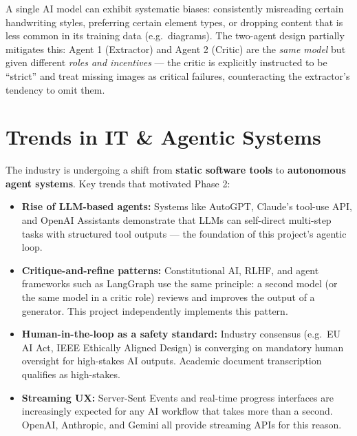 \documentclass[12pt,a4paper]{article}
\begin{document}
A single AI model can exhibit systematic biases: consistently misreading certain handwriting
styles, preferring certain element types, or dropping content that is less common in its
training data (e.g.\ diagrams). The two-agent design partially mitigates this:
Agent 1 (Extractor) and Agent 2 (Critic) are the \emph{same model} but given different
\emph{roles and incentives} — the critic is explicitly instructed to be ``strict'' and treat
missing images as critical failures, counteracting the extractor's tendency to omit them.


\section{Trends in IT \& Agentic Systems}

The industry is undergoing a shift from \textbf{static software tools} to
\textbf{autonomous agent systems}. Key trends that motivated Phase 2:

\begin{itemize}[noitemsep]
  \item \textbf{Rise of LLM-based agents:} Systems like AutoGPT, Claude's tool-use API, and
    OpenAI Assistants demonstrate that LLMs can self-direct multi-step tasks with structured
    tool outputs — the foundation of this project's agentic loop.

  \item \textbf{Critique-and-refine patterns:} Constitutional AI, RLHF, and agent frameworks
    such as LangGraph use the same principle: a second model (or the same model in a critic role)
    reviews and improves the output of a generator. This project independently implements this
    pattern.

  \item \textbf{Human-in-the-loop as a safety standard:} Industry consensus (e.g.\ EU AI Act,
    IEEE Ethically Aligned Design) is converging on mandatory human oversight for high-stakes
    AI outputs. Academic document transcription qualifies as high-stakes.

  \item \textbf{Streaming UX:} Server-Sent Events and real-time progress interfaces are
    increasingly expected for any AI workflow that takes more than a second. OpenAI, Anthropic,
    and Gemini all provide streaming APIs for this reason.
\end{itemize}
\end{document}
